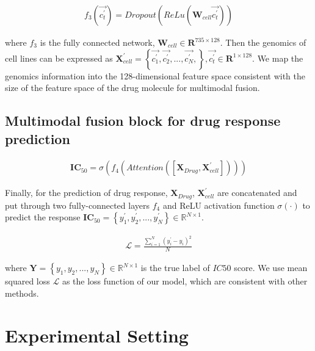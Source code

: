 \documentclass{article}
\begin{document}
\begin{align}
    f_3(\vec{c_t^{\prime}}) =  Dropout(ReLu(\textbf{W}_{cell} \vec{c_t^{\prime}}))
\end{align}

\noindent where $f_3$ is the fully connected network, $\textbf{W}_{cell} \in \mathbf{R}^{735 \times 128}$. Then the genomics of cell lines can be expressed as $ \mathbf{X}_{cell}^{\prime}  = \left \{ \vec{c_1^{\prime}},\vec{c_2^{\prime}},...,\vec{c_N^{\prime}}, \right \}, \vec{c_t^{\prime}} \in \mathbf{R}^{1 \times 128} $. We map the genomics information into the 128-dimensional feature space consistent with the size of the feature space of the drug molecule for multimodal fusion.











\subsection{Multimodal fusion block for drug response prediction}




\begin{align}
       \mathbf{IC}_{50} =  \sigma ( f_4(Attention (\left  [ \mathbf{X}_{Drug}, \mathbf{X}_{cell}^{\prime} \right ])))
\end{align}

Finally, for the prediction of drug response,  $\mathbf{X}_{Drug}$, $\mathbf{X}_{cell}^{\prime}$ are  concatenated and put through two fully-connected layers  $f_4$ and ReLU activation function $\sigma(\cdot)$ to predict the response $\mathbf{IC}_{50}= \left \{ y^{\prime}_1,y^{\prime}_2, ...,y^{\prime}_N \right \} \in \mathbb{R}^{N \times 1}$.


\begin{align}
    \mathcal{L} = \frac{\sum_{i=1}^{N}(y^{\prime}_i - y_i)^2}{N}
\end{align}

\noindent where $\mathbf{Y}= \left \{ y_1,y_2, ...,y_N \right \} \in \mathbb{R}^{N \times 1}$ is the true label of $IC50$ score. We use mean squared loss $\mathcal{L}$ as the loss function of our model, which are consistent with other methods.







\section{Experimental Setting}
\end{document}
